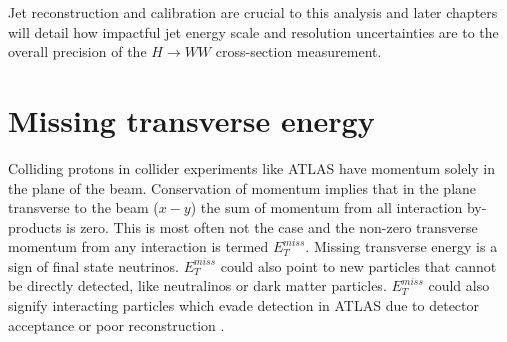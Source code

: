 Jet reconstruction and calibration are crucial to this analysis and later chapters will detail how impactful jet energy scale and resolution uncertainties are to the overall precision of the $H\rightarrow WW$ cross-section measurement. 

\section{Missing transverse energy}
Colliding protons in collider experiments like ATLAS have momentum solely in the plane of the beam. Conservation of momentum implies that in the plane transverse to the beam ($x-y$) the sum of momentum from all interaction by-products is zero. This is most often not the case and the non-zero transverse momentum from any interaction is termed $E_T^{miss}$. Missing transverse energy is a sign of final state neutrinos. $E_T^{miss}$ could also point to new particles that cannot be directly detected, like neutralinos or dark matter particles. $E_T^{miss}$ could also signify interacting particles which evade detection in ATLAS due to detector acceptance or poor reconstruction \cite{METSig}. 

